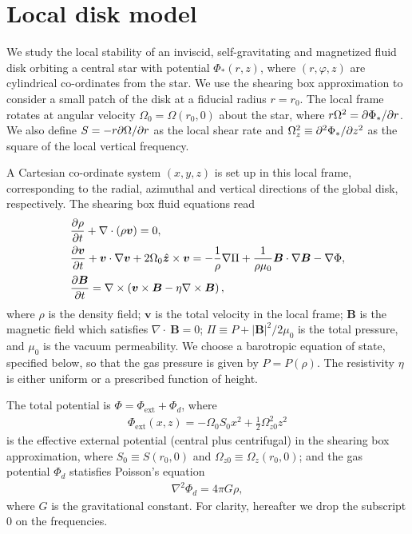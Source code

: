 \section{Local disk model}\label{setup}
We study the local stability of an inviscid, self-gravitating and
magnetized fluid disk orbiting a central star with
potential $\Phi_*(r,z)$, where $(r,\varphi,z)$ are cylindrical
co-ordinates from the star. We use the shearing box approximation     
\citep{goldreich65b} to consider a small patch of the disk at
a fiducial radius $r=r_0$. The local frame rotates at angular velocity 
$\Omega_0=\Omega(r_0,0)$ about the star, where $r\Omega^2 =
\partial\Phi_*/\partial r$. We also define $S=-r\partial\Omega/\partial r$ as the local shear
rate and $\Omega_z^2\equiv\partial^2\Phi_*/\partial z^2$ as the square of the
local vertical frequency. 

A Cartesian co-ordinate system $(x,y,z)$ is set
up in this local frame, corresponding to the radial, azimuthal and vertical
directions of the global disk, respectively. The shearing box fluid
equations read 
\begin{align} 
  &\frac{\partial\rho}{\partial t}+\nabla\cdot(\rho\bm{v}) = 0,\\
  &\frac{\partial \bm{v}}{\partial t} + \bm{v}\cdot\nabla\bm{v} +
  2\Omega_0\hat{\bm{z}}\times\bm{v} = - \frac{1}{\rho}\nabla\Pi +
  \frac{1}{\rho\mu_0}\bm{B}\cdot\nabla\bm{B}
  -\nabla\Phi,\\
  &\frac{\partial\bm{B}}{\partial t}= \nabla\times\left(\bm{v}\times\bm{B} -
  \eta\nabla\times\bm{B}\right), 
\end{align}
where $\rho$ is the density field; $\bm{v}$ is the total velocity in
the local frame; $\bm{B}$ is the magnetic field which satisfies
$\nabla\cdot~\bm{B}=0$; $\Pi \equiv P +
|\bm{B}|^2/2\mu_0$ is the total pressure, and $\mu_0$ is the vacuum
permeability. We choose a barotropic equation of state, specified
below, so that the gas pressure is given by $P=P(\rho)$. The
resistivity $\eta$ is either uniform or a prescribed function of
height. 


The total potential is $\Phi = \Phi_\mathrm{ext} + \Phi_d$, where
\begin{align}
  \Phi_\mathrm{ext}(x,z) = -\Omega_0 S_0 x^2 +
  \frac{1}{2}\Omega_{z0}^2z^2 
\end{align}
is the effective external potential (central plus centrifugal) in the
shearing box approximation, where $S_0\equiv S(r_0,0)$ and
$\Omega_{z0}\equiv\Omega_z(r_0,0)$; 
and the gas potential $\Phi_d$ statisfies Poisson's equation
\begin{align}
  \nabla^2\Phi_d = 4\pi G \rho, 
\end{align}
where $G$ is the gravitational constant. For clarity, hereafter we
drop the subscript $0$ on the frequencies. 

